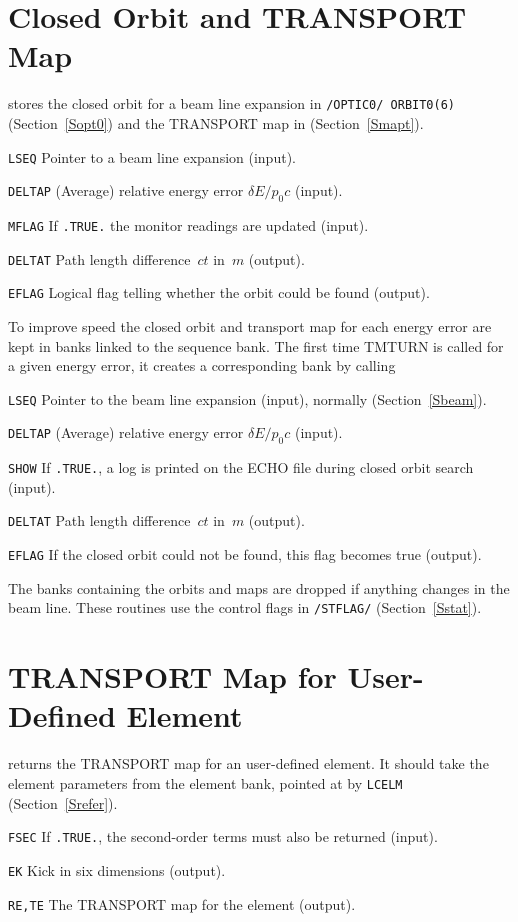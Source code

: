 \section{Closed Orbit and TRANSPORT Map}
\label{TMTURN}
stores the closed orbit for a beam line expansion in {\tt /OPTIC0/
ORBIT0(6)} (Section~\ref{Sopt0})
and the TRANSPORT map in  (Section~\ref{Smapt}).
\begin{mylist}
\item[\tt LSEQ]
Pointer to a beam line expansion (input).
\item[\tt DELTAP]
(Average) relative energy error $\delta E / p_0 c$ (input).
\item[\tt MFLAG]
If {\tt .TRUE.} the monitor readings are updated (input).
\item[\tt DELTAT]
Path length difference~$ct$ in~$m$ (output).
\item[\tt EFLAG]
Logical flag telling whether the orbit could be found (output).
\end{mylist}                   
To improve speed the closed orbit and transport map for each energy
error are kept in banks linked to the sequence bank.
The first time TMTURN is called for a given energy error,
it creates a corresponding bank by calling
\begin{mylist}
\item[\tt LSEQ]
Pointer to the beam line expansion (input),
normally  (Section~\ref{Sbeam}).
\item[\tt DELTAP]
(Average) relative energy error $\delta E / p_0 c$ (input).
\item[\tt SHOW]
If {\tt .TRUE.},
a log is printed on the ECHO file during closed orbit search (input).
\item[\tt DELTAT]
Path length difference~$ct$ in~$m$ (output).
\item[\tt EFLAG]
If the closed orbit could not be found, this flag becomes true (output).
\end{mylist}
The banks containing the orbits and maps are dropped if anything
changes in the beam line.
These routines use the control flags in {\tt /STFLAG/}
(Section~\ref{Sstat}).

\section{TRANSPORT Map for User-Defined Element}
\label{TMUSER}
returns the TRANSPORT map for an user-defined element.
It should take the element parameters from the element bank,
pointed at by {\tt LCELM} (Section~\ref{Srefer}).
\begin{mylist}
\item[\tt FSEC]
If {\tt .TRUE.}, the second-order terms must also be returned (input).
\item[\tt EK]
Kick in six dimensions (output).
\item[\tt RE,TE]
The TRANSPORT map for the element (output).
\end{mylist}

